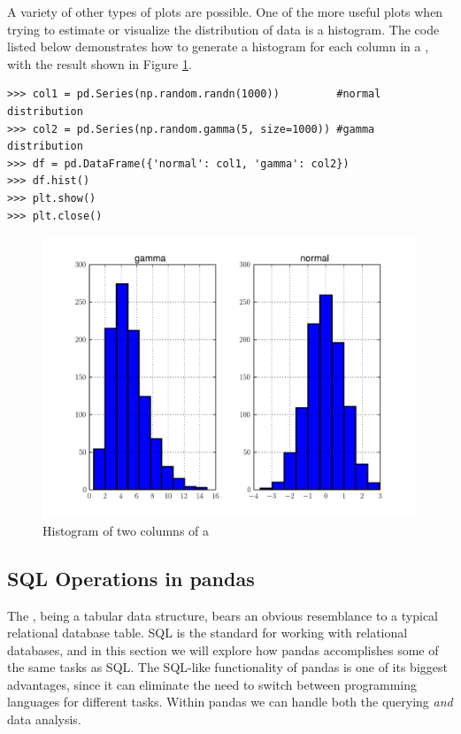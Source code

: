 A variety of other types of plots are possible. One of the more useful plots when trying to estimate or
visualize the distribution of data is a histogram. The code listed below demonstrates how to generate
a histogram for each column in a , with the result shown in Figure \ref{fig:PandasHistogram}.

\begin{lstlisting}
>>> col1 = pd.Series(np.random.randn(1000))         #normal distribution
>>> col2 = pd.Series(np.random.gamma(5, size=1000)) #gamma distribution
>>> df = pd.DataFrame({'normal': col1, 'gamma': col2})
>>> df.hist()
>>> plt.show()
>>> plt.close()
\end{lstlisting}

\begin{figure}
\centering
\includegraphics[width=.7 \textwidth]{histogram.pdf}
\caption{Histogram of two columns of a }
\label{fig:PandasHistogram}
\end{figure}

\subsection*{SQL Operations in pandas}
The , being a tabular data structure, bears an obvious resemblance to a typical relational
database table. SQL is the standard for working with relational databases, and in this section we will
explore how pandas accomplishes some of the same tasks as SQL. The SQL-like functionality of pandas is
one of its biggest advantages, since it can eliminate the need to switch between programming languages
for different tasks. Within pandas we can handle both the querying \emph{and} data analysis.

